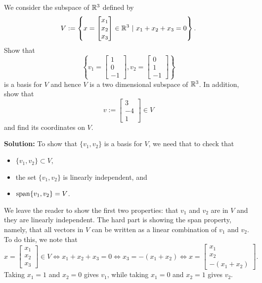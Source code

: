 \begin{example}
\label{ex:FindBasisForGivenSubsapce} We consider the subspace of $\mathbb R^3$ defined by
$$V:=\left\{ x=\begin{bmatrix} x_1 \\x_2 \\x_3  \end{bmatrix} \in \mathbb R^3 ~|~ x_1+x_2+x_3=0 \right\}. $$
Show that $$ \left\{ v_1= \left[\begin{array}{r}
    1 \\ 0 \\ -1
\end{array}\right] , 
v_2= \left[\begin{array}{r}
    0 \\ 1 \\ -1
\end{array}\right]
\right\}  $$
is a basis for $V$ and hence $V$ is a two dimensional subspace of $\mathbb R^3$. In addition, show that 
$$ v:= \left[\begin{array}{r}
    3 \\ -4 \\ 1
\end{array}\right] \in V$$
and find its coordinates on $V$. 
\end{example}

\textbf{Solution:} To show that $\{v_1, v_2 \}$ is a basis for $V$, we need that to check that
\begin{itemize}
    \item $\{v_1, v_2 \} \subset V$,
    \item the set  $\{v_1, v_2 \}$ is linearly independent, and
    \item $\mathrm{span} \{ v_1, v_2  \} =V$.
\end{itemize}
We leave the reader to show the first two properties: that $v_1$ and $v_2$ are in $V$ and they are linearly independent. The hard part is showing the span property, namely, that all vectors in $V$ can be written as a linear combination of $v_1$ and $v_2$. To do this, we note that
$$ x=\begin{bmatrix} x_1 \\x_2 \\x_3  \end{bmatrix} \in V \iff x_1+x_2+x_3=0 \iff x_3 = -(x_1 + x_2) \iff x= \begin{bmatrix} x_1 \\x_2 \\-(x_1 + x_2)  \end{bmatrix}.$$
Taking $x_1=1$ and $x_2 = 0$ gives $v_1$, while taking $x_1=0$ and $x_2 = 1$ gives $v_2.$ \\


